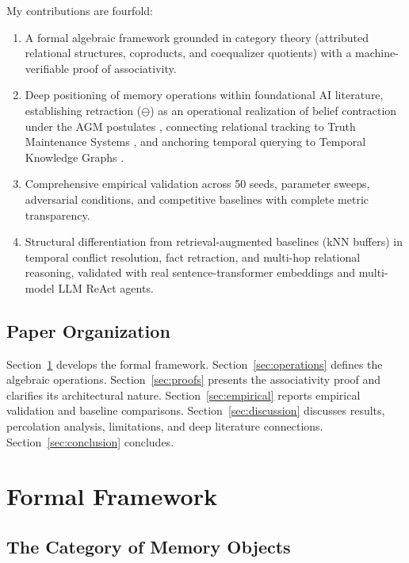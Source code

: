 \documentclass[11pt,a4paper]{article}
\theoremstyle{definition}
\begin{document}
My contributions are fourfold:
\begin{enumerate}
    \item A formal algebraic framework grounded in category theory (attributed relational structures, coproducts, and coequalizer quotients) with a machine-verifiable proof of associativity.
    \item Deep positioning of memory operations within foundational AI literature, establishing retraction ($\ominus$) as an operational realization of belief contraction under the AGM postulates \cite{alchourron1985logic}, connecting relational tracking to Truth Maintenance Systems \cite{doyle1979truth,dekleer1986assumption}, and anchoring temporal querying to Temporal Knowledge Graphs \cite{dasgupta2018hyte,leblay2018deriving,trivedi2017know}.
    \item Comprehensive empirical validation across 50 seeds, parameter sweeps, adversarial conditions, and competitive baselines with complete metric transparency.
    \item Structural differentiation from retrieval-augmented baselines (kNN buffers) in temporal conflict resolution, fact retraction, and multi-hop relational reasoning, validated with real sentence-transformer embeddings and multi-model LLM ReAct agents.
\end{enumerate}

\subsection{Paper Organization}

Section~\ref{sec:formal} develops the formal framework. Section~\ref{sec:operations} defines the algebraic operations. Section~\ref{sec:proofs} presents the associativity proof and clarifies its architectural nature. Section~\ref{sec:empirical} reports empirical validation and baseline comparisons. Section~\ref{sec:discussion} discusses results, percolation analysis, limitations, and deep literature connections. Section~\ref{sec:conclusion} concludes.

\section{Formal Framework}\label{sec:formal}

\subsection{The Category of Memory Objects}
\end{document}
